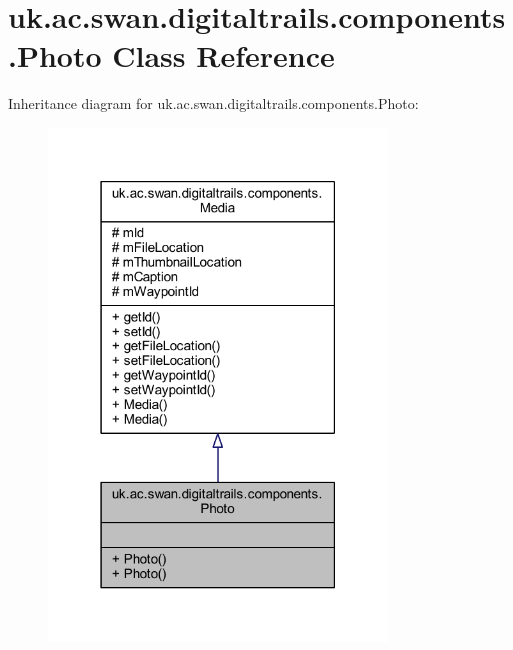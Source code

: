 \hypertarget{classuk_1_1ac_1_1swan_1_1digitaltrails_1_1components_1_1_photo}{\section{uk.\+ac.\+swan.\+digitaltrails.\+components.\+Photo Class Reference}
\label{classuk_1_1ac_1_1swan_1_1digitaltrails_1_1components_1_1_photo}
}


Inheritance diagram for uk.\+ac.\+swan.\+digitaltrails.\+components.\+Photo\+:
\nopagebreak
\begin{figure}[H]
\begin{center}
\leavevmode
\includegraphics[width=255pt]{classuk_1_1ac_1_1swan_1_1digitaltrails_1_1components_1_1_photo__inherit__graph}
\end{center}
\end{figure}


